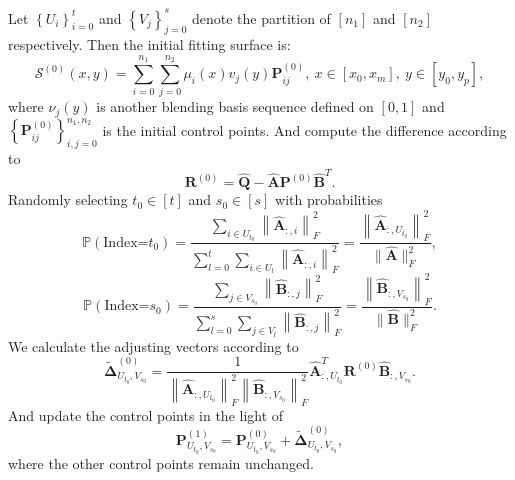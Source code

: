 \documentclass[11pt]{article}
\numberwithin{equation}{section}
\begin{document}
Let $\left\{U_i\right\}_{i=0}^t$ and $\left\{V_j\right\}_{j=0}^s$ denote the partition of $\left[n_1\right]$ and $\left[n_2\right]$ respectively. Then the initial fitting surface is:
$$
\mathcal{S}^{(0)}(x, y)=\sum_{i=0}^{n_{1}} \sum_{j=0}^{n_{2}} \mu_{i}(x) v_{j}(y) \boldsymbol{P}_{i j}^{(0)}, ~x \in\left[x_{0}, x_{m}\right], ~y \in\left[y_{0}, y_{p}\right],
$$
where $\nu_j(y)$ is another blending basis sequence defined on $[0,1]$ and $\left\{\boldsymbol{P}_{i j}^{(0)}\right\}_{i, j=0}^{n_{1}, n_{2}}$ is the initial control points. And compute the difference according to
$$
\boldsymbol{R}^{(0)}=\hat{\boldsymbol{Q}}-\hat{\boldsymbol{A}} \boldsymbol{P}^{(0)} \hat{\boldsymbol{B}}^T.
$$
Randomly selecting $t_{0} \in[t]$ and $s_{0} \in[s]$ with probabilities
$$
\mathbb{P}\left(\text {Index=} {t_0}\right)=\frac{\sum_{i \in U_{t_0}}\left\|\hat{\boldsymbol{A}}_{:, i}\right\|_F^2}{\sum_{l=0}^t \sum_{i \in U_{l}}\left\|\hat{\boldsymbol{A}}_{:, i}\right\|_F^2}=\frac{\left\|\hat{\boldsymbol{A}}_{:, U_{t_0}}\right\|_F^2}{\|\hat{\boldsymbol{A}}\|_F^2},
$$
$$
\mathbb{P}\left(\text {Index=} {s_0}\right)=\frac{\sum_{j \in V_{s_0}}\left\|\hat{\boldsymbol{B}}_{:, j}\right\|_F^2}{\sum_{l=0}^s \sum_{j \in V_{l}}\left\|\hat{\boldsymbol{B}}_{:, j}\right\|_F^2}=\frac{\left\|\hat{\boldsymbol{B}}_{:, V_{s_0}}\right\|_F^2}{\|\hat{\boldsymbol{B}}\|_F^2}.
$$
We calculate the adjusting vectors according to
$$
\tilde{\boldsymbol\Delta}_{U_{t_0}, V_{s_0}}^{(0)}=\frac{1}{\left\|\hat{\boldsymbol{A}}_{:, U_{t_0}}\right\|_F^2\left\|\hat{\boldsymbol{B}}_{:, V_{s_0}}\right\|_F^2} \hat{\boldsymbol{A}}_{:, U_{t_0}}^T \boldsymbol{R}^{(0)} \hat{\boldsymbol{B}}_{:, V_{s_0}}.
$$
And update the control points in the light of
$$
\boldsymbol{P}_{U_{t_{0}}, V_{s_{0}}}^{(1)}=\boldsymbol{P}_{U_{t_{0}}, V_{s_{0}}}^{(0)}+\tilde{\boldsymbol{\Delta}}_{U_{t_{0}}, V_{s_{0}}}^{(0)},
$$
where the other control points remain unchanged.\\
\end{document}

